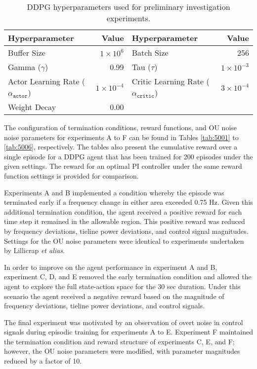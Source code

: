 \begin{table}[h]
	\centering
	\caption{DDPG hyperparameters used for preliminary investigation experiments.}
	\begin{tabular}{lrlr}
	\toprule
	\textbf{Hyperparameter} & \textbf{Value} & \textbf{Hyperparameter} & \textbf{Value} \\
	\midrule
	Buffer Size 	 & $1 \times 10^6$  & Batch Size 	& 256 \\
	Gamma ($\gamma$) & 0.99 	& Tau ($\tau$) 	& $1 \times 10^{-3}$ \\
	Actor Learning Rate ($\alpha_{\texttt{actor}}$) & $1 \times 10^{-4}$ & Critic Learning Rate ($\alpha_{\texttt{critic}}$) & $3 \times 10^{-4} $ \\
	Weight Decay & 0.00 & & \\
	\bottomrule
	\end{tabular}\label{tab:5000_hyperparameters}
\end{table}

The configuration of termination conditions, reward functions, and OU noise noise parameters for experiments A to F can be found in Tables \ref{tab:5001} to \ref{tab:5006}, respectively. The tables also present the cumulative reward over a single episode for a DDPG agent that has been trained for 200 episodes under the given settings. The reward for an optimal PI controller under the same reward function settings is provided for comparison. 

Experiments A and B implemented a condition whereby the episode was terminated early if a frequency change in either area exceeded 0.75 Hz. Given this additional termination condition, the agent received a positive reward for each time step it remained in the allowable region. This positive reward was reduced by frequency deviations, tieline power deviations, and control signal magnitudes. Settings for the OU noise parameters were identical to experiments undertaken by Lillicrap \textit{et alias}.

In order to improve on the agent performance in experiment A and B, experiment C, D, and E removed the early termination condition and allowed the agent to explore the full state-action space for the 30 sec duration. Under this scenario the agent received a negative reward based on the magnitude of frequency deviations, tieline power deviations, and control signals.

The final experiment was motivated by an observation of overt noise in control signals during episodic training for experiments A to E. Experiment F maintained the termination condition and reward structure of experiments C, E, and F; however, the OU noise parameters were modified, with parameter magnitudes reduced by a factor of 10.

